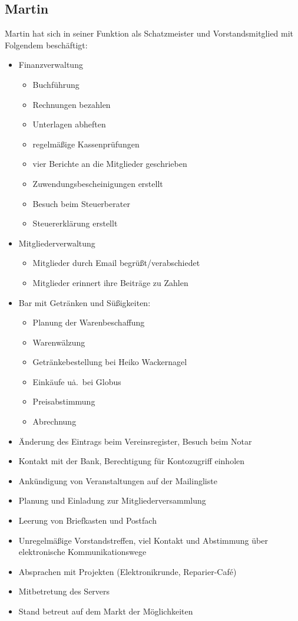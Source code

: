 \documentclass[10pt,DIV16]{scrartcl}
\begin{document}
\subsection{Martin}
Martin hat sich in seiner Funktion als Schatzmeister und Vorstandsmitglied mit Folgendem beschäftigt:
\begin{itemize}
	\item Finanzverwaltung
	\begin{itemize}
		\item Buchführung
		\item Rechnungen bezahlen
		\item Unterlagen abheften
		\item regelmäßige Kassenprüfungen
		\item vier Berichte an die Mitglieder geschrieben
		\item Zuwendungsbescheinigungen erstellt
		\item Besuch beim Steuerberater
		\item Steuererklärung erstellt
	\end{itemize}
	\item Mitgliederverwaltung
	\begin{itemize}
		\item Mitglieder durch Email begrüßt/verabschiedet
		\item Mitglieder erinnert ihre Beiträge zu Zahlen
	\end{itemize}
	\item Bar mit Getränken und Süßigkeiten:
	\begin{itemize}
		\item Planung der Warenbeschaffung
		\item Warenwälzung
		\item Getränkebestellung bei Heiko Wackernagel
		\item Einkäufe u\.a.\ bei Globus
		\item Preisabstimmung
		\item Abrechnung
	\end{itemize}
	\item Änderung des Eintrags beim Vereinsregister, Besuch beim Notar
	\item Kontakt mit der Bank, Berechtigung für Kontozugriff einholen
	\item Ankündigung von Veranstaltungen auf der Mailingliste
	\item Planung und Einladung zur Mitgliederversammlung
	\item Leerung von Briefkasten und Postfach
	\item Unregelmäßige Vorstandstreffen, viel Kontakt und Abstimmung über elektronische Kommunikationswege
	\item Absprachen mit Projekten (Elektronikrunde, Reparier-Café)
	\item Mitbetretung des Servers
	\item Stand betreut auf dem Markt der Möglichkeiten
\end{itemize}
\end{document}
